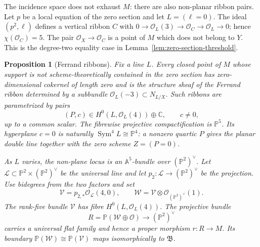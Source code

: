 \documentclass[11pt,reqno]{amsart}
\newtheorem{proposition}[theorem]{Proposition}
\theoremstyle{definition}
\newcommand{\C}{\mathbb C}
\newcommand{\Pp}{\mathbb P}
\newcommand{\Ocal}{\mathcal O}
\begin{document}
The incidence space does not exhaust $M$: there are also non-planar ribbon
pairs.  Let $p$ be a local equation of the zero section and let
$L=(\ell=0)$.  The ideal
$(p^2,\ell)$ defines a vertical ribbon $C$ with
$0\to\Ocal_L(3)\to\Ocal_C\to\Ocal_L\to0$; hence
$\chi(\Ocal_C)=5$.  The pair $\Ocal_X\to\Ocal_C$ is a point of $M$ which
does not belong to $Y$.  This is the degree-two equality case in
Lemma~\ref{lem:zero-section-threshold}.

\begin{proposition}[Ferrand ribbons]\label{prop:conic-correction-ribbons}
Fix a line $L$.  Every closed point of $M$ whose support is not
scheme-theoretically contained in the zero section has zero-dimensional
cokernel of length zero and is the structure sheaf of the Ferrand ribbon
determined by a subbundle $\Ocal_L(-3)\subset N_{L/X}$.  Such ribbons are
parametrized by pairs
\[
 (P,c)\in H^0(L,\Ocal_L(4))\oplus\C,\qquad c\ne0,
\]
up to a common scalar.  The fibrewise projective compactification is
$\Pp^5$.  Its hyperplane $c=0$ is naturally
$\operatorname{Sym}^4L\cong\Pp^4$: a nonzero quartic $P$ gives the planar
double line together with the zero scheme $Z=(P=0)$.

As $L$ varies, the non-plane locus is an $\mathbb A^5$-bundle over
$(\Pp^2)^\vee$.  Let
$\mathcal L\subset\Pp^2\times(\Pp^2)^\vee$ be the universal line and let
$p_2:\mathcal L\to(\Pp^2)^\vee$ be the projection.  Use bidegrees from the
two factors and set
\[
 \mathcal V=p_{2,*}\Ocal_{\mathcal L}(4,0),\qquad
 \mathcal W=\mathcal V\otimes\Ocal_{(\Pp^2)^\vee}(1).
\]
The rank-five bundle $\mathcal V$ has fibre $H^0(L,\Ocal_L(4))$.  The
projective bundle
\[
 R=\Pp(\mathcal W\oplus\Ocal)
 \longrightarrow(\Pp^2)^\vee
\]
carries a universal flat family and hence a proper morphism $r:R\to M$.
Its boundary $\Pp(\mathcal W)\cong\Pp(\mathcal V)$ maps isomorphically to
$\mathfrak B$.
\end{proposition}
\end{document}
